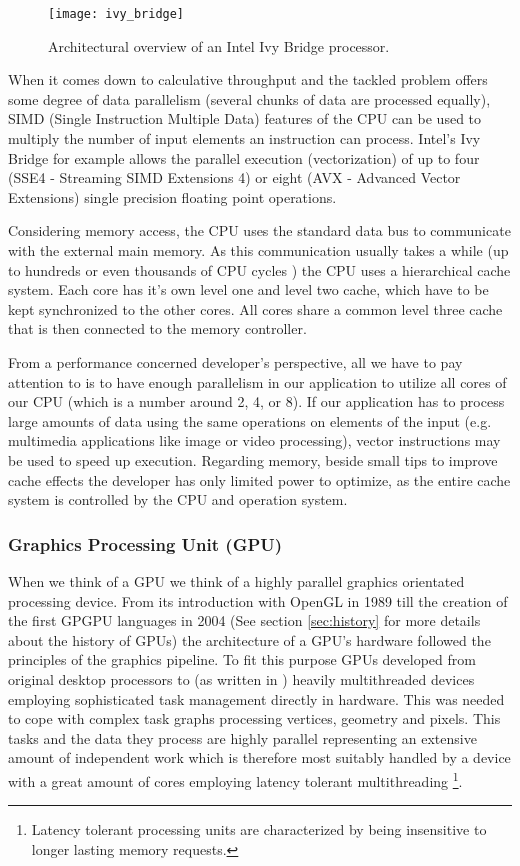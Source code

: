 \begin{figure}
\centering
\texttt{[image: ivy\_bridge]}
\caption{Architectural overview of an Intel Ivy Bridge processor. \cite{ivy_bridge}}
\label{fig:ivy_bridge}
\end{figure}

When it comes down to calculative throughput and the tackled problem offers some degree of data parallelism (several chunks of data are processed equally), SIMD (Single Instruction Multiple Data) features of the CPU can be used to multiply the number of input elements an instruction can process. Intel's Ivy Bridge for example allows the parallel execution (vectorization) of up to four (SSE4 - Streaming SIMD Extensions 4) or eight (AVX - Advanced Vector Extensions) single precision floating point operations.

Considering memory access, the CPU uses the standard data bus to communicate with the external main memory. As this communication usually takes a while (up to hundreds or even thousands of CPU cycles \cite[p.54]{opencl_book}) the CPU uses a hierarchical cache system. Each core has it's own level one and level two cache, which have to be kept synchronized to the other cores. All cores share a common level three cache that is then connected to the memory controller.

From a performance concerned developer's perspective, all we have to pay attention to is to have enough parallelism in our application to utilize all cores of our CPU (which is a number around 2, 4, or 8). If our application has to process large amounts of data using the same operations on elements of the input (e.g. multimedia applications like image or video processing), vector instructions may be used to speed up execution. Regarding memory, beside small tips to improve cache effects the developer has only limited power to optimize, as the entire cache system is controlled by the CPU and operation system. 


\subsubsection{Graphics Processing Unit (GPU)}
\label{sec:gpu}

When we think of a GPU we think of a highly parallel graphics orientated processing device. From its introduction with OpenGL in 1989 till the creation of the first GPGPU languages in 2004 (See section \ref{sec:history} for more details about the history of GPUs) the architecture of a GPU's hardware followed the principles of the graphics pipeline. To fit this purpose GPUs developed from original desktop processors to (as written in \cite{opencl_book}) heavily multithreaded devices employing sophisticated task management directly in hardware. This was needed to cope with complex task graphs processing vertices, geometry and pixels. This tasks and the data they process are highly parallel representing an extensive amount of independent work which is therefore most suitably handled by a device with a great amount of cores employing latency tolerant multithreading \footnote{Latency tolerant processing units are characterized by being insensitive to longer lasting memory requests. }.

